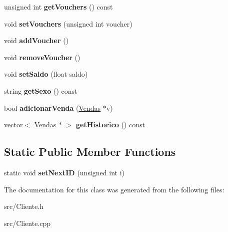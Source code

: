 \begin{DoxyCompactItemize}
\item 
\hypertarget{class_cliente_a1984ef662ce9ae14dbf654c0a6b8fb09}{unsigned int {\bfseries get\+Vouchers} () const }\label{class_cliente_a1984ef662ce9ae14dbf654c0a6b8fb09}

\item 
\hypertarget{class_cliente_aeb1b9cce72b0d01ce9bf1771a6b95c2d}{void {\bfseries set\+Vouchers} (unsigned int voucher)}\label{class_cliente_aeb1b9cce72b0d01ce9bf1771a6b95c2d}

\item 
\hypertarget{class_cliente_a0779a68f66b79b31e6dd8e5a25128f18}{void {\bfseries add\+Voucher} ()}\label{class_cliente_a0779a68f66b79b31e6dd8e5a25128f18}

\item 
\hypertarget{class_cliente_a73277ee6744a63e34233823634ec47df}{void {\bfseries remove\+Voucher} ()}\label{class_cliente_a73277ee6744a63e34233823634ec47df}

\item 
\hypertarget{class_cliente_a78fe91598a0632e05d09c9341c4b0716}{void {\bfseries set\+Saldo} (float saldo)}\label{class_cliente_a78fe91598a0632e05d09c9341c4b0716}

\item 
\hypertarget{class_cliente_a5e51d7c8aef74564f7e9770cd12b7fcf}{string {\bfseries get\+Sexo} () const }\label{class_cliente_a5e51d7c8aef74564f7e9770cd12b7fcf}

\item 
\hypertarget{class_cliente_a56fd118de07cc418426f5f54c3f4935f}{bool {\bfseries adicionar\+Venda} (\hyperlink{class_vendas}{Vendas} $\ast$v)}\label{class_cliente_a56fd118de07cc418426f5f54c3f4935f}

\item 
\hypertarget{class_cliente_ad2d27cf5a6a187c6a5faa4fee88cfd9f}{vector$<$ \hyperlink{class_vendas}{Vendas} $\ast$ $>$ {\bfseries get\+Historico} () const }\label{class_cliente_ad2d27cf5a6a187c6a5faa4fee88cfd9f}

\end{DoxyCompactItemize}
\subsection*{Static Public Member Functions}
\begin{DoxyCompactItemize}
\item 
\hypertarget{class_cliente_a072628868d4165e0b7915d975621bc8a}{static void {\bfseries set\+Next\+I\+D} (unsigned int i)}\label{class_cliente_a072628868d4165e0b7915d975621bc8a}

\end{DoxyCompactItemize}


The documentation for this class was generated from the following files\+:\begin{DoxyCompactItemize}
\item 
src/Cliente.\+h\item 
src/Cliente.\+cpp\end{DoxyCompactItemize}
